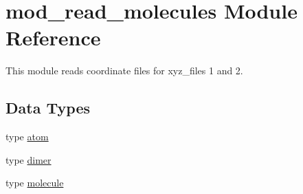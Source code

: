 \hypertarget{namespacemod__read__molecules}{}\section{mod\+\_\+read\+\_\+molecules Module Reference}
\label{namespacemod__read__molecules}


This module reads coordinate files for xyz\+\_\+files 1 and 2.  


\subsection*{Data Types}
\begin{DoxyCompactItemize}
\item 
type \hyperlink{structmod__read__molecules_1_1atom}{atom}
\item 
type \hyperlink{structmod__read__molecules_1_1dimer}{dimer}
\item 
type \hyperlink{structmod__read__molecules_1_1molecule}{molecule}
\end{DoxyCompactItemize}
